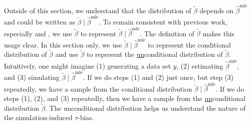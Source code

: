 \documentclass[11pt]{article}
\begin{document}
Outside of this section, we understand that the distribution of $\tilde{\beta}$ depends on $\hat{\beta}^\text{mle}$ and could be written as $\tilde{\beta} \mid \hat{\beta}^\text{mle}$.
To remain consistent with previous work, especially \cite{KingTomzWittenberg2000} and \cite{Herron1999}, we use $\tilde{\beta}$ to represent $\tilde{\beta} \mid \hat{\beta}^\text{mle}$.
The definition of $\tilde{\beta}$ makes this usage clear.
In this section only, we use $\tilde{\beta} \mid \hat{\beta}^\text{mle}$ to represent the conditional distribution of $\tilde{\beta}$ and use $\tilde{\beta}$ to represent the \underline{un}conditional distribution of $\tilde{\beta}$.
Intuitively, one might imagine (1) generating a data set $y$, (2) estimating $\hat{\beta}^\text{mle}$, and (3) simulating $\tilde{\beta} \mid \hat{\beta}^\text{mle}$.
If we do steps (1) and (2) just once, but step (3) repeatedly, we have a sample from the conditional distribution $\tilde{\beta} \mid \hat{\beta}^\text{mle}$.
If we do steps (1), (2), and (3) repeatedly, then we have a sample from the \underline{un}conditional distribution $\tilde{\beta}$.
The unconditional distribution helps us understand the nature of the simulation-induced $\tau$-bias.
\end{document}
